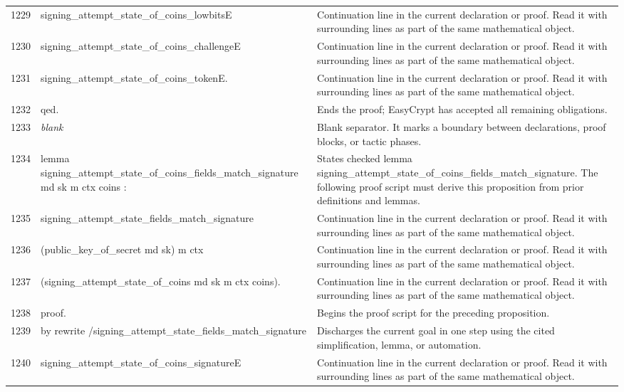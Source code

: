 \documentclass[10pt]{article}
\begin{document}
\begin{longtable}{r L{0.53\textwidth} L{0.37\textwidth}}
1229 & {\ttfamily\scriptsize            signing\_attempt\_state\_of\_coins\_lowbitsE} & Continuation line in the current declaration or proof.  Read it with surrounding lines as part of the same mathematical object. \\
1230 & {\ttfamily\scriptsize            signing\_attempt\_state\_of\_coins\_challengeE} & Continuation line in the current declaration or proof.  Read it with surrounding lines as part of the same mathematical object. \\
1231 & {\ttfamily\scriptsize            signing\_attempt\_state\_of\_coins\_tokenE.} & Continuation line in the current declaration or proof.  Read it with surrounding lines as part of the same mathematical object. \\
1232 & {\ttfamily\scriptsize qed.} & Ends the proof; EasyCrypt has accepted all remaining obligations. \\
1233 & {\ttfamily\scriptsize \emph{blank}} & Blank separator.  It marks a boundary between declarations, proof blocks, or tactic phases. \\
1234 & {\ttfamily\scriptsize lemma signing\_attempt\_state\_of\_coins\_fields\_match\_signature md sk m ctx coins :} & States checked lemma signing\_attempt\_state\_of\_coins\_fields\_match\_signature.  The following proof script must derive this proposition from prior definitions and lemmas. \\
1235 & {\ttfamily\scriptsize   signing\_attempt\_state\_fields\_match\_signature} & Continuation line in the current declaration or proof.  Read it with surrounding lines as part of the same mathematical object. \\
1236 & {\ttfamily\scriptsize     (public\_key\_of\_secret md sk) m ctx} & Continuation line in the current declaration or proof.  Read it with surrounding lines as part of the same mathematical object. \\
1237 & {\ttfamily\scriptsize     (signing\_attempt\_state\_of\_coins md sk m ctx coins).} & Continuation line in the current declaration or proof.  Read it with surrounding lines as part of the same mathematical object. \\
1238 & {\ttfamily\scriptsize proof.} & Begins the proof script for the preceding proposition. \\
1239 & {\ttfamily\scriptsize by rewrite /signing\_attempt\_state\_fields\_match\_signature} & Discharges the current goal in one step using the cited simplification, lemma, or automation. \\
1240 & {\ttfamily\scriptsize            signing\_attempt\_state\_of\_coins\_signatureE} & Continuation line in the current declaration or proof.  Read it with surrounding lines as part of the same mathematical object. \\

\end{longtable}
\end{document}
